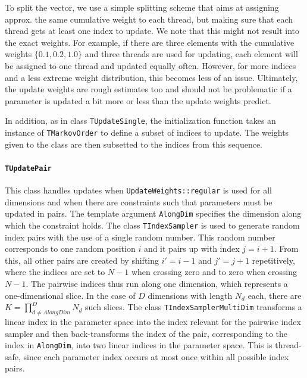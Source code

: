 \documentclass[a4paper,11pt]{article}
\newcommand{\class}[1]{\texttt{#1}}
\newcommand{\enum}[1]{\texttt{#1}}
\newcommand{\template}[1]{\texttt{#1}}
\begin{document}
To split the vector, we use a simple splitting scheme that aims at assigning approx. the same cumulative weight to each thread, but making sure that each thread gets at least one index to update. We note that this might not result into the exact weights. For example, if there are three elements with the cumulative weights $\{0.1, 0.2, 1.0\}$ and three threads are used for updating, each element will be assigned to one thread and updated equally often. However, for more indices and a less extreme weight distribution, this becomes less of an issue. Ultimately, the update weights are rough estimates too and should not be problematic if a parameter is updated a bit more or less than the update weights predict.

In addition, as in class \class{TUpdateSingle}, the initialization function takes an instance of \class{TMarkovOrder} to define a subset of indices to update. The weights given to the class are then subsetted to the indices from this sequence.

\paragraph{\class{TUpdatePair}} This class handles updates when \enum{UpdateWeights::regular} is used for all dimensions and when there are constraints such that parameters must be updated in pairs. The template argument \template{AlongDim} specifies the dimension along which the constraint holds. The class \class{TIndexSampler} is used to generate random index pairs with the use of a single random number. This random number corresponds to one random position $i$ and it pairs up with index $j = i+1$. From this, all other pairs are created by shifting $i' = i-1$ and $j' = j+1$ repetitively, where the indices are set to $N-1$ when crossing zero and to zero when crossing $N-1$. The pairwise indices thus run along one dimension, which represents a one-dimensional slice. In the case of $D$ dimensions with length $N_d$ each, there are $K = \prod_{d \neq AlongDim}^D N_d$ such slices. The class \class{TIndexSamplerMultiDim} transforms a linear index in the parameter space into the index relevant for the pairwise index sampler and then back-transforms the index of the pair, corresponding to the index in \template{AlongDim}, into two linear indices in the parameter space. This is thread-safe, since each parameter index occurs at most once within all possible index pairs.
\end{document}
